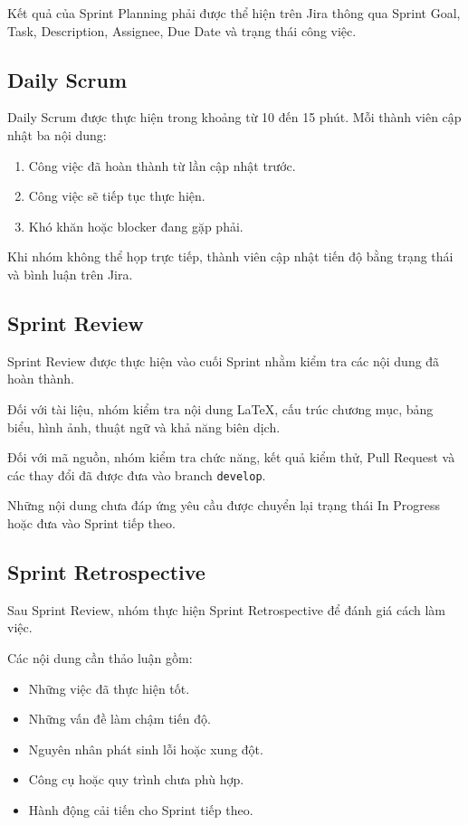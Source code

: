 Kết quả của Sprint Planning phải được thể hiện trên Jira thông qua Sprint
Goal, Task, Description, Assignee, Due Date và trạng thái công việc.

\subsection{Daily Scrum}

Daily Scrum được thực hiện trong khoảng từ 10 đến 15 phút. Mỗi thành viên
cập nhật ba nội dung:

\begin{enumerate}
	\item Công việc đã hoàn thành từ lần cập nhật trước.
	\item Công việc sẽ tiếp tục thực hiện.
	\item Khó khăn hoặc blocker đang gặp phải.
\end{enumerate}

Khi nhóm không thể họp trực tiếp, thành viên cập nhật tiến độ bằng trạng
thái và bình luận trên Jira.

\subsection{Sprint Review}

Sprint Review được thực hiện vào cuối Sprint nhằm kiểm tra các nội dung
đã hoàn thành.

Đối với tài liệu, nhóm kiểm tra nội dung LaTeX, cấu trúc chương mục,
bảng biểu, hình ảnh, thuật ngữ và khả năng biên dịch.

Đối với mã nguồn, nhóm kiểm tra chức năng, kết quả kiểm thử, Pull Request
và các thay đổi đã được đưa vào branch \texttt{develop}.

Những nội dung chưa đáp ứng yêu cầu được chuyển lại trạng thái In
Progress hoặc đưa vào Sprint tiếp theo.

\subsection{Sprint Retrospective}

Sau Sprint Review, nhóm thực hiện Sprint Retrospective để đánh giá cách
làm việc.

Các nội dung cần thảo luận gồm:

\begin{itemize}
	\item Những việc đã thực hiện tốt.
	\item Những vấn đề làm chậm tiến độ.
	\item Nguyên nhân phát sinh lỗi hoặc xung đột.
	\item Công cụ hoặc quy trình chưa phù hợp.
	\item Hành động cải tiến cho Sprint tiếp theo.
\end{itemize}

